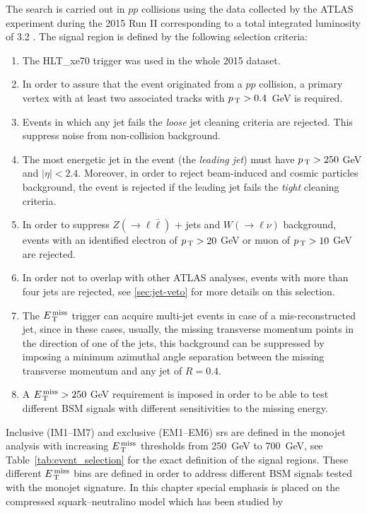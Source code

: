 The search is carried out in $pp$ collisions using the data collected by the
ATLAS experiment during the 2015 Run II corresponding to a total integrated
luminosity of 3.2 \ifb. The signal region is defined by the following selection
criteria:
\begin{enumerate}[A -]
\item The HLT\_xe70 trigger was used in the whole 2015 dataset.
\item In order to assure that the event originated from a $pp$ collision, a
  primary vertex with at least two associated tracks with $p_\mathrm{\, T} > 0.4$~GeV is
  required.
\item Events in which any jet fails the \emph{loose} jet cleaning criteria are
  rejected. This suppress noise from non-collision background.
\item The most energetic jet in the event (the \emph{leading jet}) must have
  $p_\mathrm{\, T} > 250~$GeV and $|\eta| < 2.4$. Moreover, in order to reject beam-induced
  and cosmic particles background, the event is rejected if the leading jet
  fails the \emph{tight} cleaning criteria.
\item In order to suppress $Z (\rightarrow \ell \bar{\ell})$ + jets and
  $W (\rightarrow \ell \nu)$ background, events with an identified electron of
  $p_\mathrm{\, T} > 20~$GeV or muon of $p_\mathrm{\, T} > 10~$GeV are rejected.
\item In order not to overlap with other ATLAS analyses, events with more than
  four jets are rejected, see \cref{sec:jet-veto} for more details on this
  selection.
\item The $E_\mathrm{\, T}^\mathrm{\, miss}$ trigger can acquire multi-jet events in case of a
  mis-reconstructed jet, since in these cases, usually, the missing transverse
  momentum points in the direction of one of the jets, this background can be
  suppressed by imposing a minimum azimuthal angle separation between the
  missing transverse momentum and any jet of $R =0.4$.
\item A $E_\mathrm{\, T}^\mathrm{\, miss} > 250~$GeV requirement is imposed in order to be able to test
  different BSM signals with different sensitivities to the missing energy.
\end{enumerate}
Inclusive (IM1--IM7) and exclusive (EM1--EM6) \glspl{sr} are defined in the
monojet analysis with increasing $E_\mathrm{\, T}^\mathrm{\, miss}$ thresholds from 250~GeV to 700~GeV, see
Table~\ref{tab:event_selection} for the exact definition of the signal
regions. These different $E_\mathrm{\, T}^\mathrm{\, miss}$ bins are defined in order to address different
BSM signals tested with the monojet signature. In this chapter special emphasis
is placed on the compressed squark--neutralino model which has been studied by
